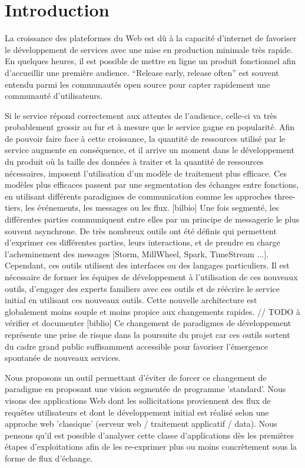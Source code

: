 \section{Introduction}

La croissance des plateformes du Web est dû à la capacité d'internet de favoriser le développement de services avec une mise en production minimale très rapide.
En quelques heures, il est possible de mettre en ligne un produit fonctionnel afin d'accueillir une première audience.
``Release early, release often'' est souvent entendu parmi les communautés open source pour capter rapidement une communauté d'utilisateurs.

Si le service répond correctement aux attentes de l'audience, celle-ci va très probablement grossir au fur et à mesure que le service gagne en popularité.
Afin de pouvoir faire face à cette croissance, la quantité de ressources utilisé par le service augmente en conséquence, et il arrive un moment dans le développement du produit où la taille des données à traiter et la quantité de ressources nécessaires, imposent l'utilisation d'un modèle de traitement plus efficace.
Ces modèles plus efficaces passent par une segmentation des échanges entre fonctions, en utilisant différents paradigmes de communication comme les approches three-tiers, les événements, les messages ou les flux. [bilbio]
Une fois segmenté, les différentes parties communiquent entre elles par un principe de messagerie le plus souvent asynchrone.
De très nombreux outils ont été définis qui permettent d'exprimer ces différentes parties, leurs interactions, et de prendre en charge l'acheminement des messages [Storm, MillWheel, Spark, TimeStream ...].
Cependant, ces outils utilisent des interfaces ou des langages particuliers. Il est nécessaire de former les équipes de développement à l'utilisation de ces nouveaux outils, d'engager des experts familiers avec ces outils et de réécrire le service initial en utilisant ces nouveaux outils.
Cette nouvelle architecture est globalement moins souple et moins propice aux changements rapides. // TODO à vérifier et documenter [biblio]
Ce changement de paradigmes de développement représente une prise de risque dans la poursuite du projet car ces outils sortent du cadre grand public suffisamment accessible pour favoriser l'émergence spontanée de nouveaux services.

Nous proposons un outil permettant d'éviter de forcer ce changement de paradigme en proposant une vision segmentée de programme 'standard'.
Nous visons des applications Web dont les sollicitations proviennent des flux de requêtes utilisateurs et dont le développement initial est réalisé selon une approche web 'classique' (serveur web / traitement applicatif / data).
Nous pensons qu'il est possible d'analyser cette classe d'applications dès les premières étapes d'exploitations afin de les re-exprimer plus ou moins concrètement sous la forme de flux d'échange.

